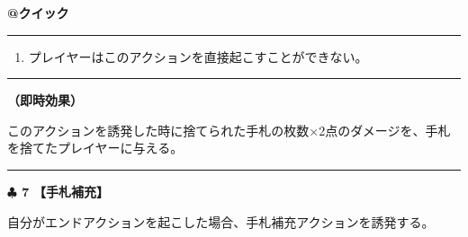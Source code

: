 \documentclass[twocolumn,a5paper,papersize,10pt]{jarticle}
\begin{document}
\vspace{-1zh}
\begin{tcolorbox}[title={\small\bf【Action】暴動}{\scriptsize （誘発）}]

{\scriptsize\bf @クイック }

\vspace{1mm} %
\hrule height 0.1mm depth 0mm width 62mm %
\vspace{1mm} %


\vspace{-1zh}%
\begin{enumerate}
\renewcommand{\labelenumi}{※}
\setlength{\leftskip}{-0.3cm}
\setlength{\itemsep}{0pt} %
\setlength{\parskip}{0pt} %

\item プレイヤーはこのアクションを直接起こすことができない。

\vspace{-3mm}%
\end{enumerate}
\vspace{-2mm} %
\vspace{1zh}%
\vspace{1mm} %
\hrule height 0.1mm depth 0mm width 62mm %
\vspace{1mm} %

{\bf（即時効果）}

このアクションを誘発した時に捨てられた手札の枚数×2点のダメージを、手札を捨てたプレイヤーに与える。

\vspace{1mm} %
\end{tcolorbox}

\vspace{-1zh}
  
 

\vspace{3mm} %
\hrule height 0.5mm depth 0mm width 66.5mm %
\vspace{1mm} %
{\Large\bf $\clubsuit$ 7} {\normalsize\bf【手札補充】} %
\vspace{1mm} %

自分がエンドアクションを起こした場合、手札補充アクションを誘発する。
\end{document}
